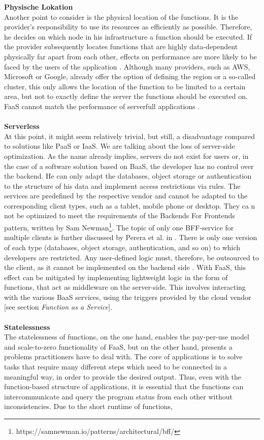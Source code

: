 \documentclass[a4paper,twoside,11pt, pagesize]{scrartcl}
\begin{document}
\textbf{Physische Lokation}\\ Another point to consider is the physical location of the functions. It is the provider's responsibility to use its resources as efficiently as possible. Therefore, he decides on which node in his infrastructure a function should be executed. If the provider subsequently locates functions that are highly data-dependent physically far apart from each other, effects on performance are more likely to be faced by the users of the application \cite{shafiei2020serverless}. Although many providers, such as AWS, Microsoft or Google, already offer the option of defining the region or a so-called cluster, this only allows the location of the function to be limited to a certain area, but not to exactly define the server the functions should be executed on. FaaS cannot match the performance of serverfull applications \cite{shafiei2020serverless}.\\\\ \textbf{Serverless}\\ At this point, it might seem relatively trivial, but still, a disadvantage compared to solutions like PaaS or IaaS. We are talking about the loss of server-side optimization. As the name already implies, servers do not exist for users or, in the case of a software solution based on BaaS, the developer has no control over the backend. He can only adapt the databases, object storage or authentication to the structure of his data and implement access restrictions via rules. The services are predefined by the respective vendor and cannot be adapted to the corresponding client types, such as a tablet, mobile phone or desktop. They ca n not be optimized to meet the requirements of the \glqq Backends For Frontends\grqq{} pattern, written by Sam Newman\footnote{https://samnewman.io/patterns/architectural/bff/}. The topic of only one BFF-service for multiple clients is further discussed by Perera et al. in \cite{perera2018rule}. There is only one version of each type (databases, object storage, authentication, and so on) to which developers are restricted. Any user-defined logic must, therefore, be outsourced to the client, as it cannot be implemented on the backend side \cite{fowler2018serverless}. With FaaS, this effect can be mitigated by implementing lightweight logic in the form of functions, that act as middleware on the server-side. This involves interacting with the various BaaS services, using the triggers provided by the cloud vendor [see section \textit{Function as a Service}].\\\\ \textbf{Statelessness}\\ The statelessness of functions, on the one hand, enables the pay-per-use model and scale-to-zero functionality of FaaS, but on the other hand, presents a problems practitioners have to deal with. The core of applications is to solve tasks that require many different steps which need to be connected in a meaningful way, in order to provide the desired output. Thus, even with the function-based structure of applications, it is essential that the functions can intercommunicate and query the program status from each other without inconsistencies. Due to the short runtime of functions, 
\end{document}

